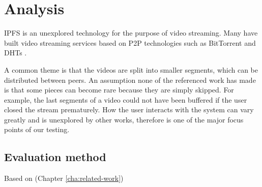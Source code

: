 \chapter{Analysis}
\label{cha:analysis}

\acs{IPFS} is an unexplored technology for the purpose of video streaming. Many have built video streaming services based on \acs{P2P} technologies such as BitTorrent and \acs{DHT}s \cite{gazdar2017toward}.

A common theme is that the videos are split into smaller segments, which can be distributed between peers. An assumption none of the referenced work has made is that some pieces can become rare because they are simply skipped. For example, the last segments of a video could not have been buffered if the user closed the stream prematurely. How the user interacts with the system can vary greatly and is unexplored by other works, therefore is one of the major focus points of our testing.

\section{Evaluation method}
Based on  (Chapter \ref{cha:related-work})

